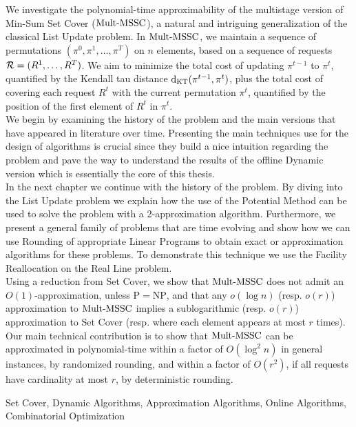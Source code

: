 \begin{abstractgr}
\end{abstractgr}

\begin{abstracten}%
We investigate the polynomial-time approximability of the multistage version of Min-Sum Set Cover ($\mathrm{Mult}\text{-}\mathrm{MSSC}$), a natural and intriguing generalization of the classical List Update problem. In $\mathrm{Mult}\text{-}\mathrm{MSSC}$, we maintain a sequence of permutations $(\pi^0, \pi^1, \ldots, \pi^T)$ on $n$ elements, based on a sequence of requests $\mathcal{R} = (R^1, \ldots, R^T)$. We aim to minimize the total cost of updating $\pi^{t-1}$ to $\pi^{t}$, quantified by the Kendall tau distance $\mathrm{d}_{\mathrm{KT}}(\pi^{t-1}, \pi^t)$, plus the total cost of covering each request $R^t$ with the current permutation $\pi^t$, quantified by the position of the first element of $R^t$ in $\pi^t$. \\

\noindent We begin by examining the history of the problem and the main versions that have appeared in literature over time. Presenting the main techniques use for the design of algorithms is crucial since they build a nice intuition regarding the problem and pave the way to understand the results of the offline Dynamic version which is essentially the core of this thesis. \\

\noindent In the next chapter we continue with the history of the problem. By diving into the List Update problem we explain how the use of the Potential Method can be used to solve the problem with a 2-approximation algorithm. Furthermore, we present a general family of problems that are time evolving and show how we can use Rounding of appropriate Linear Programs to obtain exact or approximation algorithms for these problems. To demonstrate this technique we use the Facility Reallocation on the Real Line problem. \\

\noindent Using a reduction from Set Cover, we show that $\mathrm{Mult}\text{-}\mathrm{MSSC}$ does not admit an $O(1)$-approximation, unless $\mathrm{P} = \mathrm{NP}$, and that any $o(\log n)$ (resp. $o(r)$) approximation to $\mathrm{Mult}\text{-}\mathrm{MSSC}$ implies a sublogarithmic (resp. $o(r)$) approximation to Set Cover (resp. where each element appears at most $r$ times). Our main technical contribution is to show that $\mathrm{Mult}\text{-}\mathrm{MSSC}$ can be approximated in polynomial-time within a factor of $O(\log^2 n)$ in general instances, by randomized rounding, and within a factor of $O(r^2)$, if all requests have cardinality at most $r$, by deterministic rounding. 

\begin{keywordsen}
  Set Cover,
  Dynamic Algorithms,
  Approximation Algorithms,
  Online Algorithms,
  Combinatorial Optimization
  
\end{keywordsen}

\end{abstracten}